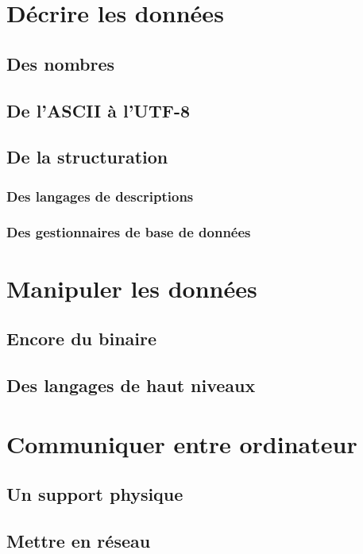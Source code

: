 \documentclass{beamer}
\begin{document}
\section{Décrire les données}
\subsection{Des nombres}
\subsection{De l'ASCII à l'UTF-8}
\subsection{De la structuration}
\subsubsection{Des langages de descriptions}
\subsubsection{Des gestionnaires de base de données}

\section{Manipuler les données}
\subsection{Encore du binaire}
\subsection{Des langages de haut niveaux}

\section{Communiquer entre ordinateur} %
\subsection{Un support physique}%
\subsection{Mettre en réseau}%
\end{document}

